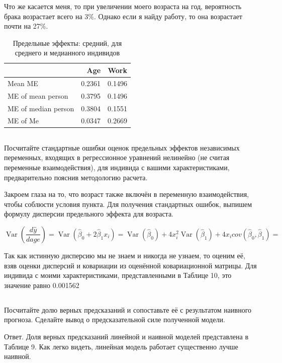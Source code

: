 \documentclass[a4paper,12pt]{article}
\def \hb{\hat{\beta}}
\def \hy{\hat{y}}
\def \hb{\hat{\beta}}
\DeclareMathOperator{\Var}{Var}
\begin{document}
Что же касается меня, то при увеличении моего возраста на год, вероятность брака возрастает всего на 3\%. Однако если я найду работу, то она возрастает почти на 27\%.

\begin{table}[ht]
\centering
\begin{tabular}{|lrr|}
	\hline
	& Age & Work \\ 
	\hline
	Mean ME & 0.2361 & 0.1496 \\ 
	ME of mean person & 0.3795 & 0.1496 \\ 
	ME of median person & 0.3804 & 0.1551 \\ 
	ME of Me & 0.0347 & 0.2669 \\ 
	\hline
\end{tabular}
\caption{Предельные эффекты: средний, для среднего и медианного индивидов}
\end{table}

\subsection{}
\Sun  Посчитайте стандартные ошибки оценок предельных эффектов независимых
переменных, входящих в регрессионное уравнений нелинейно (не считая переменные 
взаимодействия), для индивида с вашими характеристиками, предварительно пояснив
методологию расчета.


Закроем глаза на то, что возраст также включён в переменную взаимодействия, чтобы соблюсти условия пункта.
Для получения стандартных ошибок, выпишем формулу дисперсии предельного эффекта для возраста.

\[ \Var\left(\frac{d\hy}{d age}\right) = \Var(\hb_0 + 2 \hb_1 x_i) = \Var(\hb_0) + 4 x_i^2 \Var(\hb_1) + 4x_i cov(\hb_0, \hb_1) = \]

Так как истинную дисперсию мы не знаем и никогда не узнаем, то оценим её, взяв оценки дисперсий и ковариации из оценённой ковариационной матрицы. Для индивида с моими характеристиками, представленными в Таблице 10, это значение равно 0.001562

\subsection{}

\Sun Посчитайте долю верных предсказаний и сопоставьте её с результатом
наивного прогноза. Сделайте вывод о предсказательной силе полученной модели.

Ответ. Доля верных предсказаний линейной и наивной моделей представлена в Таблице 9. Как легко видеть, линейная модель работает существенно лучше наивной. 
\end{document}
